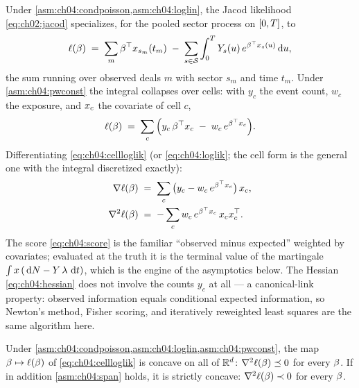 Under \cref{asm:ch04:condpoisson,asm:ch04:loglin}, the Jacod likelihood
\cref{eq:ch02:jacod} specializes, for the pooled sector process on
$[0,T]$, to
\begin{equation}\label{eq:ch04:loglik}
\ell(\beta)
 \;=\;
 \sum_{m} \beta^{\top} x_{s_m}(t_m)
 \;-\;
 \sum_{s\in\mathcal{S}} \int_{0}^{T} Y_s(u)\,
 e^{\beta^{\top} x_s(u)} \,\mathrm{d} u ,
\end{equation}
the sum running over observed deals $m$ with sector $s_m$ and time $t_m$.
Under \cref{asm:ch04:pwconst} the integral collapses over cells: with
$y_c$ the event count, $w_c$ the exposure, and $x_c$ the covariate of
cell $c$,
\begin{equation}\label{eq:ch04:cellloglik}
\ell(\beta)
 \;=\;
 \sum_{c} \Big( y_c\, \beta^{\top} x_c \;-\; w_c\, e^{\beta^{\top} x_c}
 \Big).
\end{equation}
Differentiating \cref{eq:ch04:cellloglik} (or \cref{eq:ch04:loglik}; the
cell form is the general one with the integral discretized exactly):
\begin{align}
\nabla \ell(\beta)
 &\;=\;
 \sum_{c} \big( y_c - w_c\, e^{\beta^{\top} x_c} \big)\, x_c ,
 \label{eq:ch04:score}\\
\nabla^2 \ell(\beta)
 &\;=\;
 -\sum_{c} w_c\, e^{\beta^{\top} x_c}\, x_c x_c^{\top} .
 \label{eq:ch04:hessian}
\end{align}
The score \cref{eq:ch04:score} is the familiar ``observed minus expected''
weighted by covariates; evaluated at the truth it is the terminal value of
the martingale $\int x\, (\,\mathrm{d} N - Y\,\lambda\,\,\mathrm{d} t)$, which is the
engine of the asymptotics below. The Hessian \cref{eq:ch04:hessian} does
not involve the counts $y_c$ at all --- a canonical-link property: observed
information equals conditional expected information, so Newton's method,
Fisher scoring, and iteratively reweighted least squares are the same
algorithm here.

\begin{theorem}\label{thm:ch04:concavity}
Under \cref{asm:ch04:condpoisson,asm:ch04:loglin,asm:ch04:pwconst}, the
map $\beta \mapsto \ell(\beta)$ of \cref{eq:ch04:cellloglik} is
concave on all of $\mathbb{R}^{d}$:
$\nabla^2\ell(\beta) \preceq 0$ for every $\beta$. If in addition
\cref{asm:ch04:span} holds, it is strictly concave:
$\nabla^2\ell(\beta) \prec 0$ for every $\beta$.
\end{theorem}

